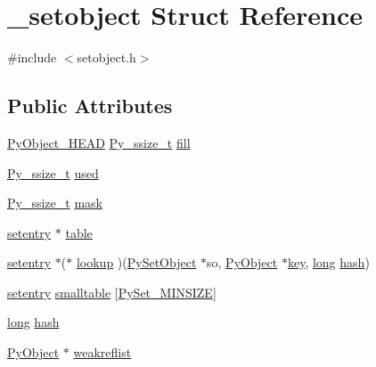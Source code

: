 \hypertarget{struct__setobject}{}\section{\+\_\+setobject Struct Reference}
\label{struct__setobject}


{\ttfamily \#include $<$setobject.\+h$>$}

\subsection*{Public Attributes}
\begin{DoxyCompactItemize}
\item 
\mbox{\hyperlink{_python27_2object_8h_a0bf35c1f3ea13f925de94d8593db3b7e}{Py\+Object\+\_\+\+H\+E\+AD}} \mbox{\hyperlink{pyport_8h_ac6411a3dfda9ac6feb9e8d859b1184bc}{Py\+\_\+ssize\+\_\+t}} \mbox{\hyperlink{struct__setobject_a5986674df7b66022d3849b67ce4748de}{fill}}
\item 
\mbox{\hyperlink{pyport_8h_ac6411a3dfda9ac6feb9e8d859b1184bc}{Py\+\_\+ssize\+\_\+t}} \mbox{\hyperlink{struct__setobject_ac25c8ee6dd89cd51f265851a1cf61bc0}{used}}
\item 
\mbox{\hyperlink{pyport_8h_ac6411a3dfda9ac6feb9e8d859b1184bc}{Py\+\_\+ssize\+\_\+t}} \mbox{\hyperlink{struct__setobject_ab43b8cf4cae699d38fef6811de322175}{mask}}
\item 
\mbox{\hyperlink{structsetentry}{setentry}} $\ast$ \mbox{\hyperlink{struct__setobject_aff6d958b639059563d402c27e9f545bf}{table}}
\item 
\mbox{\hyperlink{structsetentry}{setentry}} $\ast$($\ast$ \mbox{\hyperlink{struct__setobject_aeef4317350d80202820b281d0527f16c}{lookup}} )(\mbox{\hyperlink{setobject_8h_ab78ba704793f52f076c487b137c4b169}{Py\+Set\+Object}} $\ast$so, \mbox{\hyperlink{_python27_2object_8h_aadc84ac7aed2cfa6f20c25f62bf3dac7}{Py\+Object}} $\ast$\mbox{\hyperlink{setobject_8h_ab06f52e01abcbec81a27c56570d3c10b}{key}}, \mbox{\hyperlink{modsupport_8h_a0cb68e00fb9fb1260ee2daadd9fe6611}{long}} \mbox{\hyperlink{struct__setobject_a95f66422c1b7168688d136afa2fc7ae5}{hash}})
\item 
\mbox{\hyperlink{structsetentry}{setentry}} \mbox{\hyperlink{struct__setobject_a7ca49b8b7432c3ef2b23706318114d8e}{smalltable}} \mbox{[}\mbox{\hyperlink{setobject_8h_a4d2d577602a30e417393d879b7eeb70c}{Py\+Set\+\_\+\+M\+I\+N\+S\+I\+ZE}}\mbox{]}
\item 
\mbox{\hyperlink{modsupport_8h_a0cb68e00fb9fb1260ee2daadd9fe6611}{long}} \mbox{\hyperlink{struct__setobject_a95f66422c1b7168688d136afa2fc7ae5}{hash}}
\item 
\mbox{\hyperlink{_python27_2object_8h_aadc84ac7aed2cfa6f20c25f62bf3dac7}{Py\+Object}} $\ast$ \mbox{\hyperlink{struct__setobject_a94eb4df0964b2127ac021c6a264bf4a5}{weakreflist}}
\end{DoxyCompactItemize}



